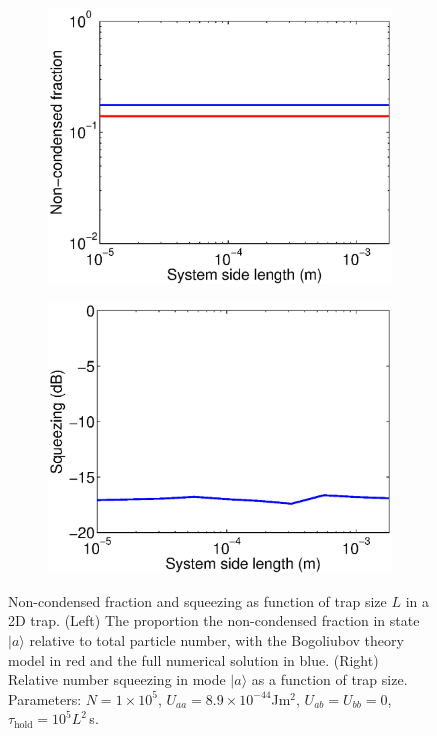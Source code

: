 \documentclass{iopart}
\begin{document}
\begin{figure}
  \centering
  \begin{subfigure}{.48\textwidth}
    \centering
    \includegraphics[width=\textwidth]{figures/2D_Bog_mode_occupation_scaling.eps}
  \end{subfigure}
  \begin{subfigure}{.48\textwidth}
    \centering
    \includegraphics[width=\textwidth]{figures/2D_squeezing_scaling.eps}
  \end{subfigure}
\caption{Non-condensed fraction and squeezing as function of trap size $L$ in a 2D trap. (Left) The proportion the non-condensed fraction in state $|a\rangle$ relative to total particle number, with the Bogoliubov theory model in red and the full numerical solution in blue. (Right) Relative number squeezing in mode $|a\rangle$ as a function of trap size. Parameters: $N=1\times 10^5$, $U_{aa} = 8.9\times 10^{-44}$Jm$^2$, $U_{ab}=U_{bb}=0$, $\tau_{\mathrm{hold}} = 10^{5} L^2$\,s.}
  \label{fig2D_squeezing_and_bog_scaling}
\end{figure}
\end{document}
